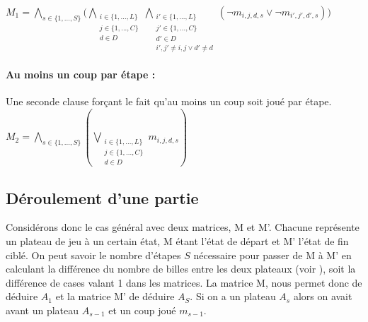 \documentclass[utf8]{article}
\begin{document}
$M_1 = {{\underset{s \in \{1,...,S\}}{\bigwedge}}({\underset{\substack{i\in\{1,...,L\} \\ j\in\{1,...,C\} \\ d \in D}}{\bigwedge}}{\underset{\substack{i'\in\{1,...,L\} \\ j'\in\{1,...,C\} \\ d' \in D \\ i',j' \neq i,j \vee d' \neq d}}{\bigwedge}}}(\neg m_{i,j,d,s} \vee \neg m_{i',j',d',s}))$\newline

\paragraph{Au moins un coup par étape :}
Une seconde clause forçant le fait qu'au moins un coup soit joué par étape. \newline
$M_2 = {\underset{s \in \{1,...,S\}}{\bigwedge}}({\underset{\substack{i \in \{1,...,L\} \\ j \in \{1,...,C\} \\ d \in D}}{\bigvee}}m_{i,j,d,s})$


\subsection{Déroulement d'une partie}
Considérons donc le cas général avec deux matrices, M et M'. Chacune représente un plateau de jeu à un certain état, M étant l'état de départ et M' l'état de fin ciblé. On peut savoir le nombre d'étapes $S$ nécessaire pour passer de M à M' en calculant la différence du nombre de billes entre les deux plateaux (voir \textbf{}), soit la différence de cases valant 1 dans les matrices.
\newline
La matrice M, nous permet donc de déduire $A_1$ et la matrice M' de déduire $A_S$.
\newline
Si on a un plateau $A_s$ alors on avait avant un plateau $A_{s-1}$ et un coup joué $m_{s-1}$. 
\end{document}
